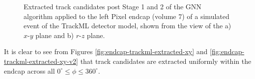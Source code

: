 \begin{figure}[htbp]%
    \centering
    \hfill
    \caption{Extracted track candidates post Stage 1 and 2 of the GNN algorithm applied to the left Pixel endcap (volume 7) of a simulated event of the TrackML detector model, shown from the view of the a) $x$-$y$ plane and b) $r$-$z$ plane.}%
    \label{fig:trackml-results-endcap-extracted-v2}%
\end{figure}

It is clear to see from Figures \ref{fig:endcap-trackml-extracted-xy} and \ref{fig:endcap-trackml-extracted-xy-v2} that track candidates are extracted uniformly within the endcap across all $ 0^{\circ} \leq \phi \leq 360^{\circ}$.

